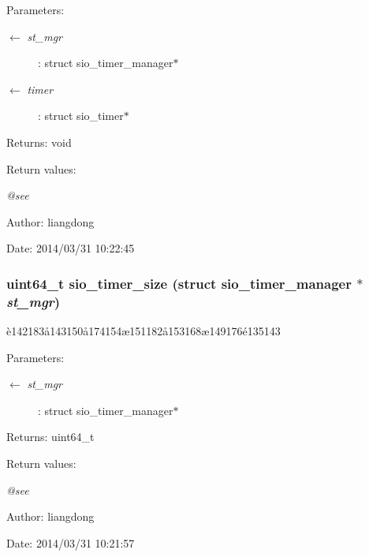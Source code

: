 \begin{Desc}
\item[Parameters:]
\begin{description}
\item[\mbox{$\leftarrow$} {\em st\_\-mgr}]: struct sio\_\-timer\_\-manager$\ast$ \item[\mbox{$\leftarrow$} {\em timer}]: struct sio\_\-timer$\ast$ \end{description}
\end{Desc}
\begin{Desc}
\item[Returns:]void \end{Desc}
\begin{Desc}
\item[Return values:]
\begin{description}
\item[{\em @see}]\end{description}
\end{Desc}
\begin{Desc}
\item[Author:]liangdong \end{Desc}
\begin{Desc}
\item[Date:]2014/03/31 10:22:45 \end{Desc}
\subsubsection{\setlength{\rightskip}{0pt plus 5cm}uint64\_\-t sio\_\-timer\_\-size (struct sio\_\-timer\_\-manager $\ast$ {\em st\_\-mgr})}\label{sio__timer_8c_a13}


\`{e}142183\aa{}143150\aa{}174154\ae{}151182\aa{}153168\ae{}149176\'{e}135143 

\begin{Desc}
\item[Parameters:]
\begin{description}
\item[\mbox{$\leftarrow$} {\em st\_\-mgr}]: struct sio\_\-timer\_\-manager$\ast$ \end{description}
\end{Desc}
\begin{Desc}
\item[Returns:]uint64\_\-t \end{Desc}
\begin{Desc}
\item[Return values:]
\begin{description}
\item[{\em @see}]\end{description}
\end{Desc}
\begin{Desc}
\item[Author:]liangdong \end{Desc}
\begin{Desc}
\item[Date:]2014/03/31 10:21:57 \end{Desc}
